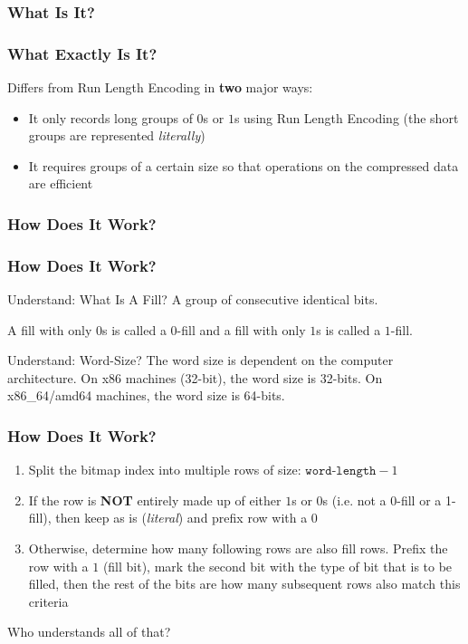 \documentclass[11pt]{beamer}
\begin{document}
\subsubsection[Word-Aligned Hybrid]{What Is It?}
\begin{frame}
	\frametitle{What Exactly Is It?}
	
	Differs from Run Length Encoding in \textbf{two} major ways:
	\begin{itemize}
		\pause
		\item It only records long groups of $0$s or $1$s using Run Length Encoding (the short groups are represented \textit{literally})
		\pause
		\item It requires groups of a certain size so that operations on the compressed data are efficient
	\end{itemize}
\end{frame}

\subsubsection[Word-Aligned Hybrid]{How Does It Work?}
\begin{frame}
	\frametitle{How Does It Work?}
	
	\begin{block}{Understand: What Is A Fill?}
		A group of consecutive identical bits. 
		
		A fill with only $0$s is called a $0$-fill and a fill with only $1$s is called a $1$-fill.
	\end{block}
	\begin{block}{Understand: Word-Size?}
		The word size is dependent on the computer architecture. On x86 machines (32-bit), the word size is 32-bits. On x86\_64/amd64 machines, the word size is 64-bits.
	\end{block}
\end{frame}

\begin{frame}
	\frametitle{How Does It Work?}
	
	\begin{enumerate}
		\item Split the bitmap index into multiple rows of size: $\texttt{word-length}- 1$
		\item If the row is \textbf{NOT} entirely made up of either $1$s or $0$s (i.e. not a 0-fill or a 1-fill), then keep as is (\textit{literal}) and prefix row with a $0$
		\item Otherwise, determine how many following rows are also fill rows. Prefix the row with a $1$ (fill bit), mark the second bit with the type of bit that is to be filled, then the rest of the bits are how many subsequent rows also match this criteria
	\end{enumerate}
	
	\pause
	Who understands all of that?
\end{frame}
\end{document}
